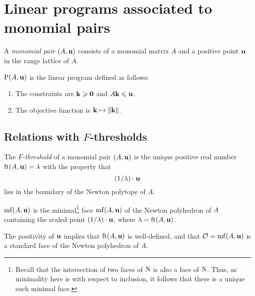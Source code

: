 \documentclass[11pt]{amsart}
\renewcommand{\!}[1]{{\color{red}\text{$\star$\,}#1\,$\star$}}
\begin{document}
\newpage



\section{Linear programs associated to monomial pairs}


\begin{definition}
A \emph{monomial pair} $(A, \mathbf{u})$ consists of a monomial matrix $A$ and a positive point $\mathbf{u}$ in the range lattice of $A$.
\end{definition}


\begin{definition}
$\mathrm{P}(A, \mathbf{u})$ is the linear program defined as follows:
\begin{enumerate}
\item The constraints are $\mathbf{k} \geqslant \mathbf{0}$ and $A \mathbf{k} \leqslant \mathbf{u}$.
\item The objective function is $\mathbf{k} \mapsto \| \mathbf{k} \|$.
\end{enumerate}
\end{definition}




\subsection{Relations with $F$-thresholds}
\label{opt sets: SS}

\begin{definition}
The \emph{$F$-threshold} of a monomial pair $(A, \mathbf{u})$ is the unique positive real number $\operatorname{ft}(A, \mathbf{u}) = \lambda$ with the property that  \[ (1/\lambda)  \cdot \mathbf{u}  \] 
lies in the boundary of the Newton polytope of $A$.  
\end{definition}

\begin{definition}
$\operatorname{mf}(A, \mathbf{u})$ is the minimal\footnote{Recall that the intersection of two faces of $\mathrm{N}$ is also a face of $\mathrm{N}$. Thus, as minimality here is with respect to inclusion, it follows that there is a unique such minimal face.} face $\operatorname{mf}(A, \mathbf{u})$ of the Newton polyhedron of $A$ containing the scaled point $(1/\lambda) \cdot \mathbf{u}$, where $\lambda = \operatorname{ft}(A, \mathbf{u})$.
\end{definition}


\begin{remark}  The positivity of $\mathbf{u}$ implies that $\operatorname{ft}(A, \mathbf{u})$ is well-defined, and that $\mathcal{O} = \operatorname{mf}(A, \mathbf{u})$ is a standard face of the Newton polyhedron of $A$.
\end{remark}
\end{document}

